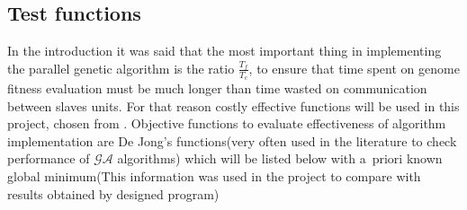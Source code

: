 \subsection{Test functions}
\label{cha:function}
In the introduction it was said that the most important thing in implementing
the parallel genetic algorithm is the ratio $\frac{T_f}{T_c}$, to ensure that time spent on
genome fitness evaluation must be much longer than time wasted on communication
between slaves units. For that reason costly effective functions will be used in this
project, chosen from \cite{bib25}. 
Objective functions to evaluate effectiveness of algorithm implementation are De Jong's 
functions(very often used in the literature to check performance of
$\mathcal{GA}$ algorithms) which will be listed below with a~priori known global
minimum(This information was used in the project to compare with results
obtained by designed program) 
